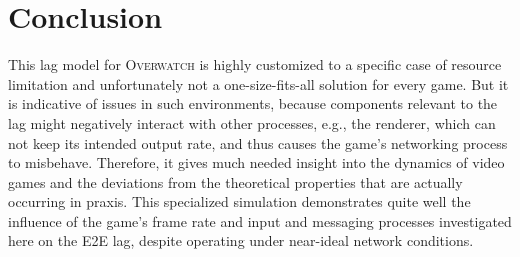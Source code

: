 \section{Conclusion}
\label{sec:conclusion}

This lag model for \textsc{Overwatch} is highly customized to a specific case of resource limitation and unfortunately not a one-size-fits-all solution for every game. But it is indicative of issues in such environments, because components relevant to the lag might negatively interact with other processes, e.g., the renderer, which can not keep its intended output rate, and thus causes the game's networking process to misbehave. Therefore, it gives much needed insight into the dynamics of video games and the deviations from the theoretical properties that are actually occurring in praxis.  This specialized simulation demonstrates quite well the influence of the game's frame rate and input and messaging processes investigated here on the \gls{E2E} lag, despite operating under near-ideal network conditions.